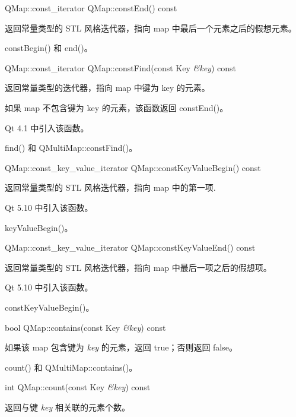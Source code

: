 \splitLine

QMap::const\_iterator QMap::constEnd() const

返回常量类型的 STL 风格迭代器，指向 map 中最后一个元素之后的假想元素。

\begin{seeAlso}
constBegin() 和 end()。
\end{seeAlso}

\splitLine

QMap::const\_iterator QMap::constFind(const Key \emph{\&key}) const

返回常量类型的迭代器，指向 map 中键为 key 的元素。

如果 map 不包含键为 key 的元素，该函数返回 constEnd()。

Qt 4.1 中引入该函数。

\begin{seeAlso}
find() 和 QMultiMap::constFind()。
\end{seeAlso}

\splitLine

QMap::const\_key\_value\_iterator QMap::constKeyValueBegin() const

返回常量类型的 STL 风格迭代器，指向 map 中的第一项.

Qt 5.10 中引入该函数。

\begin{seeAlso}
keyValueBegin()。
\end{seeAlso}

\splitLine

QMap::const\_key\_value\_iterator QMap::constKeyValueEnd() const

返回常量类型的 STL 风格迭代器，指向 map 中最后一项之后的假想项。

Qt 5.10 中引入该函数。

\begin{seeAlso}
constKeyValueBegin()。
\end{seeAlso}

\splitLine

bool QMap::contains(const Key \emph{\&key}) const

如果该 map 包含键为 \emph{key} 的元素，返回 true；否则返回 false。

\begin{seeAlso}
count() 和 QMultiMap::contains()。
\end{seeAlso}

\splitLine

int QMap::count(const Key \emph{\&key}) const

返回与键 \emph{key} 相关联的元素个数。

